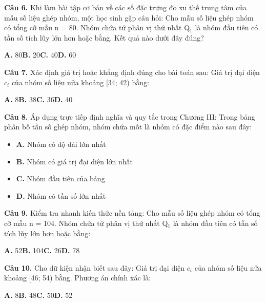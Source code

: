 \documentclass[11pt,a4paper]{article}
\begin{document}
\textbf{\color{primary} Câu 6.} Khi làm bài tập cơ bản về các số đặc trưng đo xu thế trung tâm của mẫu số liệu ghép nhóm, một học sinh gặp câu hỏi: Cho mẫu số liệu ghép nhóm có tổng cỡ mẫu n = 80. Nhóm chứa tứ phân vị thứ nhất Q$_1$ là nhóm đầu tiên có tần số tích lũy lớn hơn hoặc bằng. Kết quả nào dưới đây đúng?\par
\hspace*{1.5em}\textbf{A.} 80\quad\quad \textbf{B.} 20\quad\quad \textbf{C.} 40\quad\quad \textbf{D.} 60\par\vspace{2pt}
\textbf{\color{primary} Câu 7.} Xác định giá trị hoặc khẳng định đúng cho bài toán sau: Giá trị đại diện $c_i$ của nhóm số liệu nửa khoảng [34; 42) bằng:\par
\hspace*{1.5em}\textbf{A.} 8\quad\quad \textbf{B.} 38\quad\quad \textbf{C.} 36\quad\quad \textbf{D.} 40\par\vspace{2pt}
\textbf{\color{primary} Câu 8.} Áp dụng trực tiếp định nghĩa và quy tắc trong Chương III: Trong bảng phân bố tần số ghép nhóm, nhóm chứa mốt là nhóm có đặc điểm nào sau đây:\par
\begin{itemize}\setlength{\itemsep}{1pt}\setlength{\parskip}{0pt}
  \item[] \textbf{A.} Nhóm có độ dài lớn nhất
  \item[] \textbf{B.} Nhóm có giá trị đại diện lớn nhất
  \item[] \textbf{C.} Nhóm đầu tiên của bảng
  \item[] \textbf{D.} Nhóm có tần số lớn nhất
\end{itemize}\vspace{2pt}
\textbf{\color{primary} Câu 9.} Kiểm tra nhanh kiến thức nền tảng: Cho mẫu số liệu ghép nhóm có tổng cỡ mẫu n = 104. Nhóm chứa tứ phân vị thứ nhất Q$_1$ là nhóm đầu tiên có tần số tích lũy lớn hơn hoặc bằng:\par
\hspace*{1.5em}\textbf{A.} 52\quad\quad \textbf{B.} 104\quad\quad \textbf{C.} 26\quad\quad \textbf{D.} 78\par\vspace{2pt}
\textbf{\color{primary} Câu 10.} Cho dữ kiện nhận biết sau đây: Giá trị đại diện $c_i$ của nhóm số liệu nửa khoảng [46; 54) bằng. Phương án chính xác là:\par
\hspace*{1.5em}\textbf{A.} 8\quad\quad \textbf{B.} 48\quad\quad \textbf{C.} 50\quad\quad \textbf{D.} 52\par\vspace{2pt}
\end{document}
